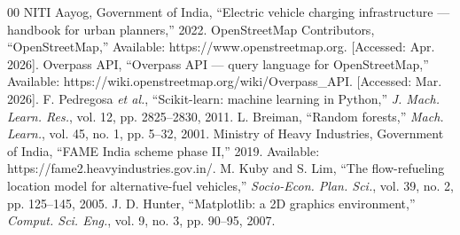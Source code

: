 \documentclass[conference]{IEEEtran}
\begin{document}
\begin{thebibliography}{00}
 NITI Aayog, Government of India, ``Electric vehicle charging infrastructure --- handbook for urban planners,'' 2022.
 OpenStreetMap Contributors, ``OpenStreetMap,'' Available: https://www.openstreetmap.org. [Accessed: Apr. 2026].
 Overpass API, ``Overpass API --- query language for OpenStreetMap,'' Available: https://wiki.openstreetmap.org/wiki/Overpass\_API. [Accessed: Mar. 2026].
 F. Pedregosa \textit{et al.}, ``Scikit-learn: machine learning in Python,'' \textit{J. Mach. Learn. Res.}, vol. 12, pp. 2825--2830, 2011.
 L. Breiman, ``Random forests,'' \textit{Mach. Learn.}, vol. 45, no. 1, pp. 5--32, 2001.
 Ministry of Heavy Industries, Government of India, ``FAME India scheme phase II,'' 2019. Available: https://fame2.heavyindustries.gov.in/.
 M. Kuby and S. Lim, ``The flow-refueling location model for alternative-fuel vehicles,'' \textit{Socio-Econ. Plan. Sci.}, vol. 39, no. 2, pp. 125--145, 2005.
 J. D. Hunter, ``Matplotlib: a 2D graphics environment,'' \textit{Comput. Sci. Eng.}, vol. 9, no. 3, pp. 90--95, 2007.
\end{thebibliography}
\end{document}
